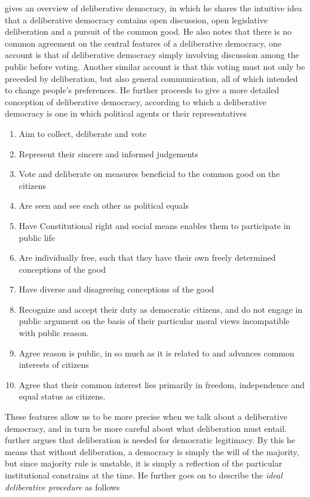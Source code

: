 \citet{freemanDeliberativeDemocracySympathetic2000} gives an overview of deliberative democracy, in which he shares the intuitive idea that a deliberative democracy contains open discussion, open legislative deliberation and a pursuit of the common good. He also notes that there is no common agreement on the central features of a deliberative democracy, one account is that of deliberative democracy simply involving discussion among the public before voting. Another similar account is that this voting must not only be preceded by deliberation, but also general communication, all of which intended to change people's preferences. He further proceeds to give a more detailed conception of deliberative democracy, according to which a deliberative democracy is one in which political agents or their representatives

\begin{enumerate}
	\label{list:deliberative-democracy}
	\setlength\itemsep{1px}
	\item  Aim to collect, deliberate and vote
	\item  Represent their sincere and informed judgements
	\item  Vote and deliberate on measures beneficial to the common good on the citizens
	\item  Are seen and see each other as political equals
	\item  Have Constitutional right and social means enables them to participate in public life
	\item  Are individually free, such that they have their own freely determined conceptions of the good
	\item  Have diverse and disagreeing conceptions of the good
	\item  Recognize and accept their duty as democratic citizens, and do not engage in public argument on the basis of their particular moral views incompatible with public reason.
	\item  Agree reason is public, in so much as it is related to and advances common interests of citizens
	\item  Agree that their common interest lies primarily in freedom, independence and equal status as citizens.
\end{enumerate}

These features allow us to be more precise when we talk about a deliberative democracy, and in turn be more careful about what deliberation must entail. \citet{cohenDELIBERATIONDEMOCRATICLEGITIMACY2002} further argues that deliberation is needed for democratic legitimacy. By this he means that without deliberation, a democracy is simply the will of the majority, but since majority rule is unstable, it is simply a reflection of the particular institutional constrains at the time. He further goes on to describe the \textit{ideal deliberative procedure} as follows

